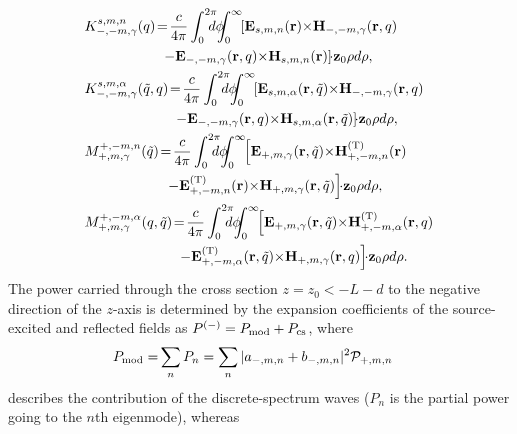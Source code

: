 \documentclass[summary]{URSIGASS2020}
\def\a{\alpha}
\begin{document}
\begin{align}
&K_{-,-m,\gamma}^{s,m,n}(q)\!=\!\frac{c}{4\pi}\int_{0}^{2\pi}\!\!\!\!\!{d}{\phi}\!\!\!\!\int_{0}^{\infty}\!\!\left[{\bf E}_{s,m,{n}}({\bf r}){\times}{\bf H}_{-,-m,\gamma}({\bf r},{q})\right.\nonumber\\
&\hspace{19mm}\left. - {\bf E}_{-,-{m},\gamma}({\bf r},{q}){\times}{\bf H}_{s,m,{n}}({\bf r})\right]\!\!{\cdot}{\bf z}_0\rho{d}\rho,\nonumber\\
&K_{-,-m,\gamma}^{s,m,\a}(\tilde{q},q)\!=\!\frac{c}{4\pi}\int_{0}^{2\pi}\!\!\!\!\!{d}{\phi}\!\!\!\!\int_{0}^{\infty}\!\!\left[{\bf E}_{s,m,{\a}}({\bf r},\tilde{q}){\times}{\bf H}_{-,-m,\gamma}({\bf r},{q})\right.\nonumber\\
&\hspace{22mm}\left. - {\bf E}_{-,-{m},\gamma}({\bf r},{q}){\times}{\bf H}_{s,m,{\a}}({\bf r},\tilde{q})\right]\!\!{\cdot}{\bf z}_0\rho{d}\rho,\nonumber\\
&M_{+,m,\gamma}^{+,-m,n}(\tilde{q})\!=\!\frac{c}{4\pi}\int_{0}^{2\pi}\!\!\!\!\!{d}{\phi}\!\!\!\!\int_{0}^{\infty}\!\!\left[{\bf E}_{+,m,{\gamma}}({\bf r},\tilde{q}){\times}{\bf H}^{({\rm T})}_{+,-m,n}({\bf r})\right.\nonumber\\
&\hspace{20mm}\left. - {\bf E}^{({\rm T})}_{+,-{m},n}({\bf r}){\times}{\bf H}_{+,m,{\gamma}}({\bf r},\tilde{q})\right]\!\!{\cdot}{\bf z}_0\rho{d}\rho,\nonumber\\
&M_{+,m,\gamma}^{+,-m,\alpha}(q,\tilde{q})\!=\!\frac{c}{4\pi}\int_{0}^{2\pi}\!\!\!\!\!{d}{\phi}\!\!\!\!\int_{0}^{\infty}\!\!\left[{\bf E}_{+,m,{\gamma}}({\bf r},\tilde{q}){\times}{\bf H}^{({\rm T})}_{+,-m,\alpha}({\bf r},q)\right.\nonumber\\
&\hspace{23mm}\left. - {\bf E}^{({\rm T})}_{+,-{m},\alpha}({\bf r},\tilde{q}){\times}{\bf H}_{+,m,{\gamma}}({\bf r},q)\right]\!\!{\cdot}{\bf z}_0\rho{d}\rho. \label{eq14}
\end{align}
The power carried through the cross section $ z = z_{0}<-L-d $ to the negative direction of the $ z $-axis is determined by the expansion coefficients of the source-excited and reflected fields as $ P^{(-)}=P_{\rm mod}+P_{\rm cs} $, where
\begin{align}
P_{\rm mod}=&\sum_{n}P_{n}=\sum_{n}|a_{-,m,n}+b_{-,m,n}|^2{\cal P}_{+,m,n} \label{P_mod}
\end{align}
describes the contribution of the discrete-spectrum waves
($ P_{n} $ is the partial power going to the $ n $th eigenmode), whereas
\end{document}
